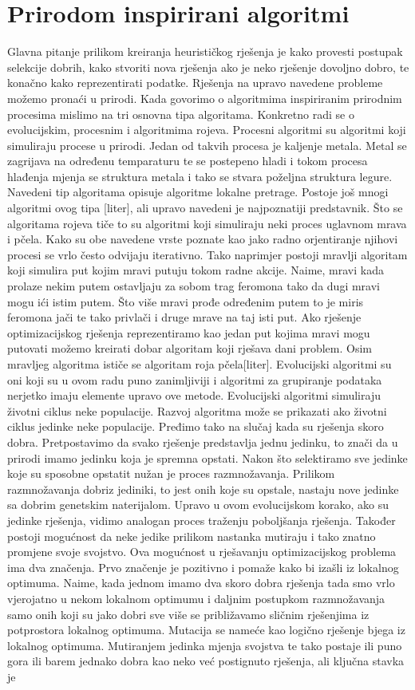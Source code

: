 \documentclass[a4paper,twoside,12pt]{memoir} %
\begin{document}
\section{Prirodom inspirirani algoritmi}
Glavna pitanje prilikom kreiranja heurističkog rješenja je kako provesti postupak selekcije dobrih, kako stvoriti nova rješenja ako je neko rješenje dovoljno dobro, te konačno kako reprezentirati podatke. Rješenja na upravo navedene probleme možemo pronaći u prirodi. Kada govorimo o algoritmima inspiriranim prirodnim procesima mislimo na tri osnovna tipa algoritama. Konkretno radi se o evolucijskim, procesnim i algoritmima rojeva. Procesni algoritmi su algoritmi koji simuliraju procese u prirodi. Jedan od takvih procesa je kaljenje metala. Metal se zagrijava na određenu temparaturu te se postepeno hladi i tokom procesa hlađenja mjenja se struktura metala i tako se stvara poželjna struktura legure. Navedeni tip algoritama opisuje algoritme lokalne pretrage. Postoje još mnogi algoritmi ovog tipa [liter], ali upravo navedeni je najpoznatiji predstavnik. Što se algoritama rojeva tiče to su algoritmi koji simuliraju neki proces uglavnom mrava i pčela. Kako su obe navedene vrste poznate kao jako radno orjentiranje njihovi procesi se vrlo često odvijaju iterativno. Tako naprimjer postoji mravlji algoritam koji simulira put kojim mravi putuju tokom radne akcije. Naime, mravi kada prolaze nekim putem ostavljaju za sobom trag feromona tako da dugi mravi mogu ići istim putem. Što više mravi prođe određenim putem to je miris feromona jači te tako privlači i druge mrave na taj isti put. Ako rješenje optimizacijskog rješenja reprezentiramo kao jedan put kojima mravi mogu putovati možemo kreirati dobar algoritam koji rješava dani problem. Osim mravljeg algoritma ističe se algoritam roja pčela[liter]. Evolucijski algoritmi su oni koji su u ovom radu puno zanimljiviji i algoritmi za grupiranje podataka nerjetko imaju elemente upravo ove metode. Evolucijski algoritmi simuliraju životni ciklus neke populacije. Razvoj algoritma može se prikazati ako životni ciklus jedinke neke populacije. Pređimo tako na slučaj kada su rješenja skoro dobra. Pretpostavimo da svako rješenje predstavlja jednu jedinku, to znači da u prirodi imamo jedinku koja je spremna opstati. Nakon što selektiramo sve jedinke koje su sposobne opstatit nužan je proces razmnožavanja. Prilikom razmnožavanja dobriz jediniki, to jest onih koje su opstale, nastaju nove jedinke sa dobrim genetskim naterijalom. Upravo u ovom evolucijskom korako, ako su jedinke rješenja, vidimo analogan proces traženju poboljšanja rješenja. Također postoji mogućnost da neke jedike prilikom nastanka mutiraju i tako znatno promjene svoje svojstvo. Ova mogućnost u rješavanju optimizacijskog problema ima dva značenja. Prvo značenje je pozitivno i pomaže kako bi izašli iz lokalnog optimuma. Naime, kada jednom imamo dva skoro dobra rješenja tada smo vrlo vjerojatno u nekom lokalnom optimumu i daljnim postupkom razmnožavanja samo onih koji su jako dobri sve više se približavamo sličnim rješenjima iz potprostora lokalnog optimuma. Mutacija se nameće kao logično rješenje bjega iz lokalnog optimuma. Mutiranjem jedinka mjenja svojstva te tako postaje ili puno gora ili barem jednako dobra kao neko već postignuto rješenja, ali ključna stavka je 
\end{document}
